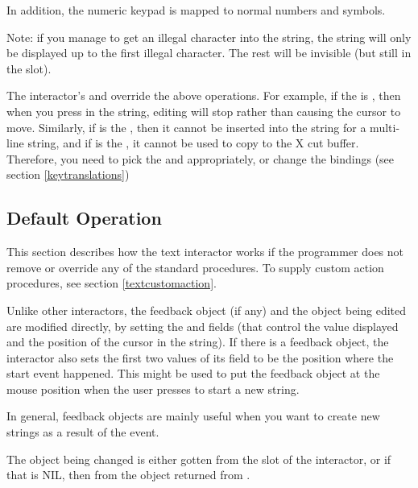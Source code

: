 In addition, the numeric keypad is mapped to normal numbers and symbols.

Note: if you manage to get an illegal character into the string, the string
will only be displayed up to the first illegal character.  The rest will be
invisible (but still in the  slot).

The interactor's  and  override the above
operations.  For example, if the  is ,
then when you press in the string, editing will stop rather than causing
the cursor to move.  Similarly, if  is the
, then it
cannot be inserted into the string for a multi-line string, and if
 is the , it cannot be used to copy to the
X cut buffer.  Therefore, you need to pick the  and
 appropriately, or change the bindings (see section
\ref{keytranslations})

\subsection{Default Operation}

This section describes how the text interactor works
if the programmer does not remove or override any of the standard
 procedures.  To supply custom action procedures, see section
\ref{textcustomaction}.

Unlike other interactors, the feedback object (if any) and
the object being edited are modified directly, by setting the 
and  fields (that control the value displayed and the
position of the cursor in the string).  If there is a feedback object, the
interactor also sets the first two values of its  field to be the
position where the start event happened.  This might be used to put the
feedback object at the mouse position when the user presses to start a new string.

In general, feedback objects are mainly useful when you want to create new
strings as a result of the event.

The object being changed is
either gotten from the  slot of the interactor, or if
that is NIL, then from the object returned from .

